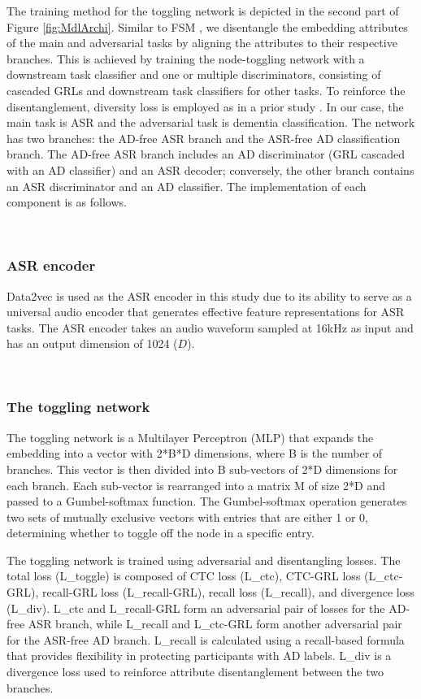 The training method for the toggling network is depicted in the second part of Figure \ref{fig:MdlArchi}. Similar to FSM \cite{huang2022attention}, we disentangle the embedding attributes of the main and adversarial tasks by aligning the attributes to their respective branches. This is achieved by training the node-toggling network with a downstream task classifier and one or multiple discriminators, consisting of cascaded GRLs and downstream task classifiers for other tasks. To reinforce the disentanglement, diversity loss is employed as in a prior study \cite{huang2022attention}. In our case, the main task is ASR and the adversarial task is dementia classification. The network has two branches: the AD-free ASR branch and the ASR-free AD classification branch. The AD-free ASR branch includes an AD discriminator (GRL cascaded with an AD classifier) and an ASR decoder; conversely, the other branch contains an ASR discriminator and an AD classifier. The implementation of each component is as follows.

\
\subsubsection{ASR encoder}

Data2vec \cite{baevski2022data2vec} is used as the ASR encoder in this study due to its ability to serve as a universal audio encoder that generates effective feature representations for ASR tasks. The ASR encoder takes an audio waveform sampled at 16kHz as input and has an output dimension of 1024 ($D$).

\
\subsubsection{The toggling network}

The toggling network is a Multilayer Perceptron (MLP) that expands the embedding into a vector with 2*B*D dimensions, where B is the number of branches. This vector is then divided into B sub-vectors of 2*D dimensions for each branch. Each sub-vector is rearranged into a matrix M of size 2*D and passed to a Gumbel-softmax function. The Gumbel-softmax operation generates two sets of mutually exclusive vectors with entries that are either 1 or 0, determining whether to toggle off the node in a specific entry.

The toggling network is trained using adversarial and disentangling losses. The total loss (L_toggle) is composed of CTC loss (L_ctc), CTC-GRL loss (L_ctc-GRL), recall-GRL loss (L_recall-GRL), recall loss (L_recall), and divergence loss (L_div). L_ctc and L_recall-GRL form an adversarial pair of losses for the AD-free ASR branch, while L_recall and L_ctc-GRL form another adversarial pair for the ASR-free AD branch. L_recall is calculated using a recall-based formula that provides flexibility in protecting participants with AD labels. L_div is a divergence loss used to reinforce attribute disentanglement between the two branches.

